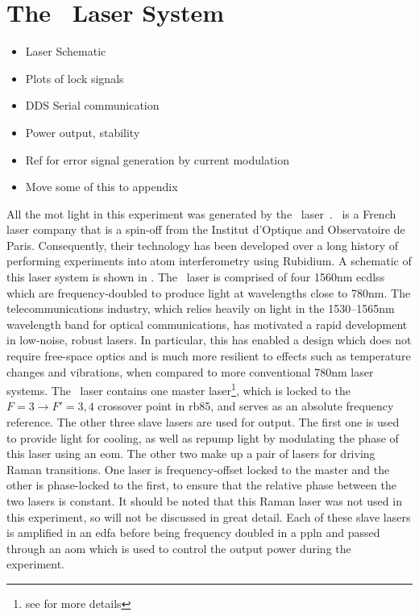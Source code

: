 \section{The \Muquans\ Laser System}\label{sec:setup_muquans}
\begin{itemize}
    \item Laser Schematic
    \item Plots of lock signals
    \item DDS Serial communication
    \item Power output, stability
    \item Ref for error signal generation by current modulation
    \item Move some of this to appendix
\end{itemize}
All the \ac{mot} light in this experiment was generated by the \Muquans\ laser~\cite{muquansWebPage}. \Muquans\ is a French laser company that is a spin-off from the Institut d'Optique and Observatoire de Paris. Consequently, their technology has been developed over a long history of performing experiments into atom interferometry using Rubidium. A schematic of this laser system is shown in . The \Muquans\ laser is comprised of four 1560nm \acp{ecdls} which are frequency-doubled to produce light at wavelengths close to 780nm. The telecommunications industry, which relies heavily on light in the 1530--1565nm wavelength band for optical communications, has motivated a rapid development in low-noise, robust lasers. In particular, this has enabled a design which does not require free-space optics and is much more resilient to effects such as temperature changes and vibrations, when compared to more conventional 780nm laser systems. The \Muquans\ laser contains one master laser\footnote{see  for more details}, which is locked to the \(F = 3 \rightarrow F' = 3,4\) crossover point in \ac{rb85}, and serves as an absolute frequency reference. The other three slave lasers are used for output. The first one is used to provide light for cooling, as well as repump light by modulating the phase of this laser using an \ac{eom}. The other two make up a pair of lasers for driving Raman transitions. One laser is frequency-offset locked to the master and the other is phase-locked to the first, to ensure that the relative phase between the two lasers is constant. It should be noted that this Raman laser was not used in this experiment, so will not be discussed in great detail. Each of these slave lasers is amplified in an \ac{edfa} before being frequency doubled in a \ac{ppln} and passed through an \ac{aom} which is used to control the output power during the experiment.
